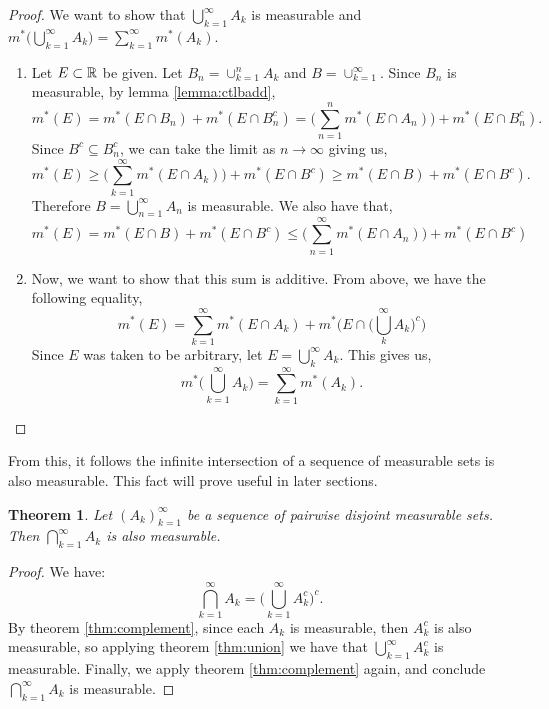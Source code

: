 \documentclass{article}
\newtheorem{theorem}{Theorem}
\theoremstyle{axiom} \newtheorem{axiom}{Axiom}
\theoremstyle{definition} \newtheorem{definition}{Definition}
\theoremstyle{example} \newtheorem{example}{Example}
\theoremstyle{proposition} \newtheorem{prop}{Proposition}
\theoremstyle{lemma} \newtheorem{lemma}{Lemma}
\begin{document}
\begin{proof}
	We want to show that $\bigcup^{\infty}_{k=1}A_k$ is measurable and 
	$m^*\bigg(\bigcup^{\infty}_{k=1} A_k \bigg) = \sum^{\infty}_{k=1} m^*(A_k)$.
	\begin{enumerate}
		\item Let $E \subset \mathbb{R}$ be given. Let $B_n = \cup^{n}_{k=1} A_k$ and 
		$B = \cup^{\infty}_{k=1}$. Since $B_n$ is measurable, by lemma \ref{lemma:ctlbadd},
		\begin{equation*}
			m^*(E) = m^*(E \cap B_n) + m^*(E\cap B^c_n) = 
			\bigg(\sum^n_{n=1} m^*(E\cap A_n)\bigg) + m^*(E\cap B^c_n). 
		\end{equation*}
		Since $B^c \subseteq B^c_n$, we can take the limit as $n\rightarrow\infty$ 
		giving us,
		\begin{equation*}
			m^*(E) \geq \bigg( \sum^{\infty}_{k=1} m^*(E\cap A_k) \bigg) +
			m^*(E \cap B^c) \geq m^*(E\cap B)+m^*(E\cap B^c).
		\end{equation*}
		Therefore $B = \bigcup^{\infty}_{n=1} A_n$ is measurable. We also have
		that,
		\begin{equation*}
			m^*(E) = m^*(E\cap B) + m^*(E\cap B^c) \leq 
			\bigg(\sum^{\infty}_{n=1}m^*(E\cap A_n) \bigg) + m^*(E\cap B^c)
		\end{equation*}
		\item  Now, we want to show that this sum is additive. From above, we
		have the following equality, 
		\begin{equation*} 
			m^*(E) = \sum^{\infty}_{k=1} m^*(E\cap A_k) + 
			m^*\bigg( E \cap \bigg(\bigcup^{\infty}_k A_k\bigg)^c\bigg) 
		\end{equation*} 
		Since $E$ was taken to be arbitrary, let $E = \bigcup^{\infty}_k A_k $.
		This gives us,
		\begin{equation*} 
			m^*\bigg(\bigcup^{\infty}_{k=1} A_k \bigg) = \sum^{\infty}_{k=1} m^*(A_k). 
		\end{equation*} 
	\end{enumerate}
\end{proof}

From this, it follows the infinite intersection of a sequence of measurable sets is also measurable.
This fact will prove useful in later sections.
\begin{theorem} \label{thm:intersection}
	Let $(A_k)^{\infty}_{k=1}$ be a sequence of pairwise disjoint measurable sets. Then
	$\bigcap^{\infty}_{k=1} A_k$ is also measurable.
\end{theorem}
\begin{proof}
	We have:
	\begin{equation*}
		\bigcap^{\infty}_{k=1} A_k = \bigg(\bigcup^{\infty}_{k=1}A^c_k\bigg)^c.
	\end{equation*}
	By theorem \ref{thm:complement}, since each $A_k$ is measurable, then
	$A^c_k$ is also measurable, so applying theorem \ref{thm:union} we have that 
	$\bigcup^{\infty}_{k=1}A^c_k$ is measurable. Finally, we apply theorem 
	\ref{thm:complement} again, and conclude $\bigcap^{\infty}_{k=1} A_k$ is
	measurable. 
\end{proof}
\end{document}
